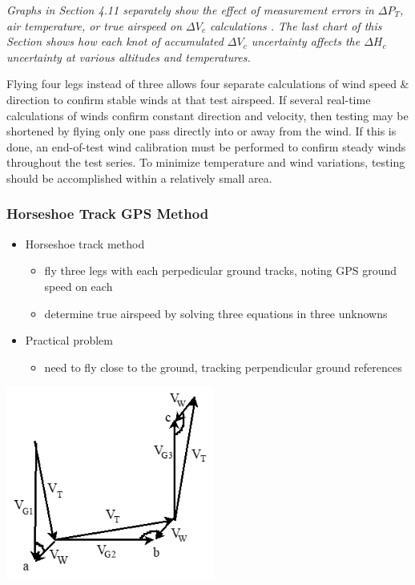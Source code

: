 \documentclass[
]{book}
\providecommand{\tightlist}{%
  \setlength{\itemsep}{0pt}\setlength{\parskip}{0pt}}
\begin{document}
\emph{Graphs in Section 4.11 separately show the effect of measurement errors in \(\Delta P_T\), air temperature, or true airspeed on \(\Delta V_c\) calculations . The last chart of this Section shows how each knot of accumulated \(\Delta V_c\) uncertainty affects the \(\Delta H_c\) uncertainty at various altitudes and temperatures.}

Flying four legs instead of three allows four separate calculations of wind speed \& direction to confirm stable winds at that test airspeed. If several real-time calculations of winds confirm constant direction and velocity, then testing may be shortened by flying only one pass directly into or away from the wind. If this is done, an end-of-test wind calibration must be performed to confirm steady winds throughout the test series. To minimize temperature and wind variations, testing should be accomplished within a relatively small area.

\hypertarget{horseshoe-track-gps-method}{%
\subsubsection*{Horseshoe Track GPS Method}\label{horseshoe-track-gps-method}}

\begin{itemize}
\tightlist
\item
  Horseshoe track method

  \begin{itemize}
  \tightlist
  \item
    fly three legs with each perpedicular ground tracks, noting GPS ground speed on each
  \item
    determine true airspeed by solving three equations in three unknowns
  \end{itemize}
\item
  Practical problem

  \begin{itemize}
  \tightlist
  \item
    need to fly close to the ground, tracking perpendicular ground references
  \end{itemize}
\end{itemize}

\includegraphics[width=2.7in,height=2.49514in]{media/04/image28.png}
\end{document}
